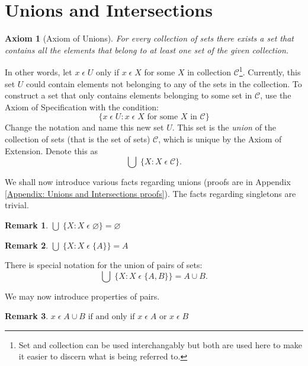 \documentclass[12pt]{article}
\newtheorem{axiom}{Axiom}
\newtheorem{remark}{Remark}
\begin{document}
\section{Unions and Intersections}
\begin{axiom}[Axiom of Unions]
    For every collection of sets there exists a set that contains all the elements that belong to at least
    one set of the given collection.
\end{axiom}
In other words, let $x\;\epsilon\;U$ only if $x\;\epsilon\;X$ for some $X$ in collection $\mathcal{C}$\footnote{Set and collection
can be used interchangably but both are used here to make it easier to discern what is being referred to.}. Currently, this set $U$
could contain elements not belonging to any of the sets in the collection. To construct a set that only contains elements belonging to some set in
$\mathcal{C}$, use the Axiom of Specification with the condition:
\begin{displaymath}
    \{x\;\epsilon\;U: x\;\epsilon\;X \text{ for some } X \text{ in } \mathcal{C}\}
\end{displaymath}
Change the notation and name this new set $U$. This set is the \textit{union} of the collection of sets (that
is the set of sets) $\mathcal{C}$, which is unique by the Axiom of Extension. Denote this as
\begin{equation}
    \bigcup\;\{X: X\;\epsilon\;\mathcal{C}\}.
\end{equation}

We shall now introduce various facts regarding unions (proofs are in Appendix \ref{Appendix: Unions and Intersections proofs}).
The facts regarding singletons are trivial.
\begin{remark}
    $\bigcup\;\{X: X\;\epsilon\;\varnothing\} = \varnothing$
\end{remark}

\begin{remark}
    $\bigcup\;\{X: X\;\epsilon\;\{A\}\} = A$
\end{remark}

There is special notation for the union of pairs of sets:
\begin{equation}
    \bigcup\;\{X: X\;\epsilon\;\{A, B\}\} = A \cup B.
\end{equation}

We may now introduce properties of pairs.

\begin{remark}
    $x\;\epsilon\;A \cup B \text{ if and only if } x\;\epsilon\;A \text{ or } x\;\epsilon\;B$
\end{remark}
\end{document}
